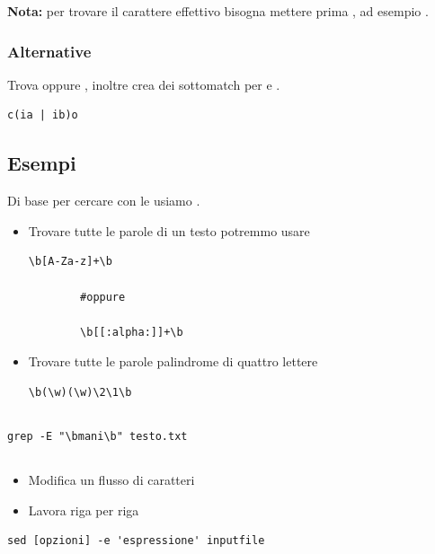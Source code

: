 \documentclass[../main.tex]{subfiles}
\begin{document}
\textbf{Nota:} per trovare il carattere effettivo bisogna mettere prima \code{\textbackslash}, ad esempio \code{\textbackslash*}.

\vspace{0.5cm}
\subsubsection{Alternative}
Trova  oppure , inoltre crea dei sottomatch per  e .
\begin{lstlisting}[style=bash]
    c(ia | ib)o
\end{lstlisting}

\pagebreak
\subsection{Esempi}
Di base per cercare con le  usiamo .

\begin{itemize}
    \item Trovare tutte le parole di un testo potremmo usare
    \begin{lstlisting}[style=bash]
        \b[A-Za-z]+\b
    
        #oppure
    
        \b[[:alpha:]]+\b
    \end{lstlisting}
    \item Trovare tutte le parole palindrome di quattro lettere
    \begin{lstlisting}[style=bash]
        \b(\w)(\w)\2\1\b
    \end{lstlisting}
\end{itemize}

\vspace{1cm}
\subsection{}
\begin{lstlisting}[style=bash]
    grep -E "\bmani\b" testo.txt
\end{lstlisting}

\vspace{1cm}
\subsection{}
\begin{itemize}
    \item Modifica un flusso di caratteri
    \item Lavora riga per riga
\end{itemize}
\begin{lstlisting}[style=bash]
    sed [opzioni] -e 'espressione' inputfile
\end{lstlisting}
\end{document}
